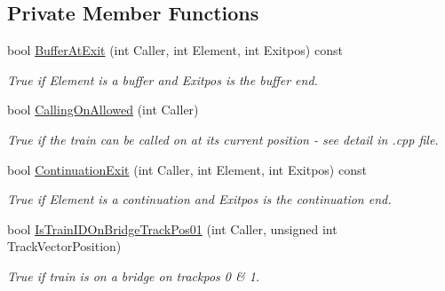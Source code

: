 \subsection*{Private Member Functions}
\begin{DoxyCompactItemize}
\item 
\mbox{\label{class_t_train_a2e3e9fd7367a9333b7550b225d328d13}} 
bool \mbox{\hyperlink{class_t_train_a2e3e9fd7367a9333b7550b225d328d13}{Buffer\+At\+Exit}} (int Caller, int Element, int Exitpos) const
\begin{DoxyCompactList}\small\item\em True if Element is a buffer and Exitpos is the buffer end. \end{DoxyCompactList}\item 
\mbox{\label{class_t_train_a4524b72ef62ef2c1375f58fac05929ee}} 
bool \mbox{\hyperlink{class_t_train_a4524b72ef62ef2c1375f58fac05929ee}{Calling\+On\+Allowed}} (int Caller)
\begin{DoxyCompactList}\small\item\em True if the train can be called on at its current position -\/ see detail in .cpp file. \end{DoxyCompactList}\item 
\mbox{\label{class_t_train_a36b7b4901add145605ba1e540801b6cf}} 
bool \mbox{\hyperlink{class_t_train_a36b7b4901add145605ba1e540801b6cf}{Continuation\+Exit}} (int Caller, int Element, int Exitpos) const
\begin{DoxyCompactList}\small\item\em True if Element is a continuation and Exitpos is the continuation end. \end{DoxyCompactList}\item 
\mbox{\label{class_t_train_a0a3a41dac70ba46da2f7f9fd03f2a63f}} 
bool \mbox{\hyperlink{class_t_train_a0a3a41dac70ba46da2f7f9fd03f2a63f}{Is\+Train\+I\+D\+On\+Bridge\+Track\+Pos01}} (int Caller, unsigned int Track\+Vector\+Position)
\begin{DoxyCompactList}\small\item\em True if train is on a bridge on trackpos 0 \& 1. \end{DoxyCompactList}\item 
\mbox{\label{class_t_train_a6cbff3229246b7a156cd64a531aa60a6}} 

\end{DoxyCompactItemize}
